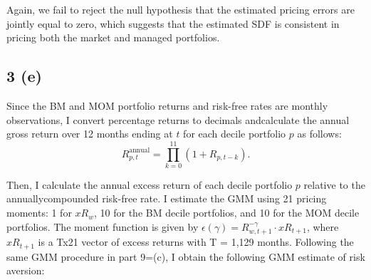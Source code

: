 \documentclass[11pt]{article}
\begin{document}
Again, we fail to reject the null hypothesis that the estimated pricing errors are jointly equal to zero, 
which suggests that the estimated SDF is consistent in pricing both the market and managed portfolios.
\subsection*{3 (e)}
Since the BM and MOM portfolio returns and risk-free rates are monthly observations, I convert percentage
returns to decimals andcalculate the annual gross return over 12 months ending at $t$
 for each decile portfolio $p$ as follows:
\[
R_{p,t}^{\text{annual}} = \prod_{k=0}^{11} (1 + R_{p,t-k}).
\]

Then, I calculate the annual excess return of each decile portfolio $p$ relative to the annuallycompounded risk-free rate. 
I estimate the GMM using 21 pricing moments: 1 for $xR_w$, 10 for the BM decile portfolios, and 10 for the MOM decile portfolios. 
The moment function is given by $\epsilon(\gamma) = R_{w,t+1}^{-\gamma} \cdot xR_{t+1}$, where $xR_{t+1}$ is a Tx21 vector of excess returns with T = 1,129 months. 
Following the same GMM procedure in part 9=(c), I obtain the following GMM estimate of risk aversion:
\end{document}
